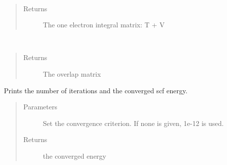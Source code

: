 \documentclass[letterpaper,10pt,english]{sphinxmanual}
\begin{document}
\begin{fulllineitems}
\begin{fulllineitems}
\end{fulllineitems}


\begin{fulllineitems}
\label{\detokenize{RHF:ghf.RHF.RHF.get_one_e}}~\begin{quote}\begin{description}
\item[{Returns}] \leavevmode
The one electron integral matrix: T + V

\end{description}\end{quote}

\end{fulllineitems}


\begin{fulllineitems}
\label{\detokenize{RHF:ghf.RHF.RHF.get_ovlp}}~\begin{quote}\begin{description}
\item[{Returns}] \leavevmode
The overlap matrix

\end{description}\end{quote}

\end{fulllineitems}


\begin{fulllineitems}
\label{\detokenize{RHF:ghf.RHF.RHF.get_scf_solution}}
Prints the number of iterations and the converged scf energy.
\begin{quote}\begin{description}
\item[{Parameters}] \leavevmode
{} \textendash{} Set the convergence criterion. If none is given, 1e-12 is used.

\item[{Returns}] \leavevmode
the converged energy


\end{description}
\end{quote}
\end{fulllineitems}
\end{fulllineitems}
\end{document}
